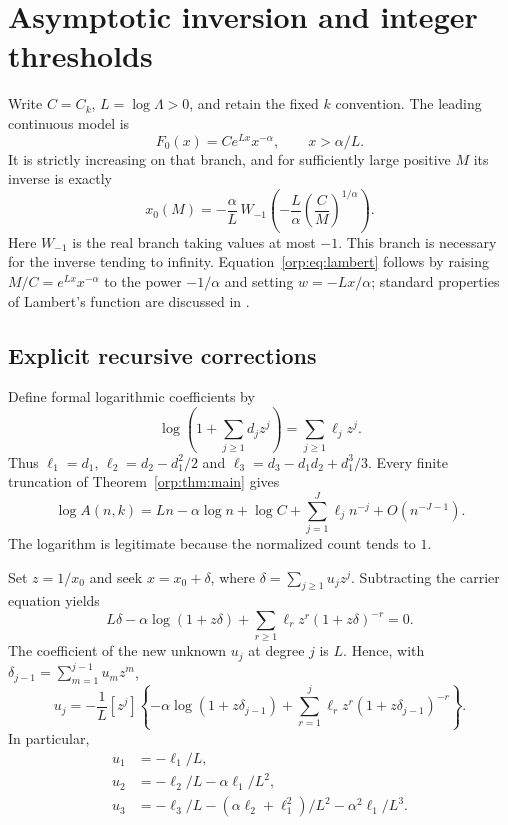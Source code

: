 \documentclass[11pt]{article}
\theoremstyle{remark}\newtheorem{remark}[theorem]{Remark}
\begin{document}
\section{Asymptotic inversion and integer thresholds}\label{orp:sec:inverse}
Write $C=C_k$, $L=\log\Lambda>0$, and retain the fixed $k$ convention. The leading continuous model is
\[
 F_0(x)=Ce^{Lx}x^{-\alpha},\qquad x>\alpha/L.
\]
It is strictly increasing on that branch, and for sufficiently large positive $M$ its inverse is exactly
\begin{equation}\label{orp:eq:lambert}
 x_0(M)=-\frac\alpha L\,W_{-1}\left(-\frac L\alpha
                    \left(\frac CM\right)^{1/\alpha}\right).
\end{equation}
Here $W_{-1}$ is the real branch taking values at most $-1$. This branch is necessary for the inverse tending to infinity. Equation~\eqref{orp:eq:lambert} follows by raising $M/C=e^{Lx}x^{-\alpha}$ to the power $-1/\alpha$ and setting $w=-Lx/\alpha$; standard properties of Lambert's function are discussed in \cite{lambert}.

\subsection{Explicit recursive corrections}
Define formal logarithmic coefficients by
\begin{equation}\label{orp:eq:ell}
 \log\left(1+\sum_{j\ge1}d_jz^j\right)=\sum_{j\ge1}\ell_jz^j.
\end{equation}
Thus $\ell_1=d_1$, $\ell_2=d_2-d_1^2/2$ and
$\ell_3=d_3-d_1d_2+d_1^3/3$. Every finite truncation of Theorem~\ref{orp:thm:main} gives
\begin{equation}\label{orp:eq:logcount}
 \log A(n,k)=Ln-\alpha\log n+\log C+
 \sum_{j=1}^{J}\ell_jn^{-j}+O(n^{-J-1}).
\end{equation}
The logarithm is legitimate because the normalized count tends to $1$.

Set $z=1/x_0$ and seek $x=x_0+\delta$, where $\delta=\sum_{j\ge1}u_jz^j$. Subtracting the carrier equation yields
\begin{equation}\label{orp:eq:invformal}
 L\delta-\alpha\log(1+z\delta)+
 \sum_{r\ge1}\ell_rz^r(1+z\delta)^{-r}=0.
\end{equation}
The coefficient of the new unknown $u_j$ at degree $j$ is $L$. Hence, with
$\delta_{j-1}=\sum_{m=1}^{j-1}u_mz^m$,
\begin{equation}\label{orp:eq:invrec}
 u_j=-\frac1L[z^j]\left\{-\alpha\log(1+z\delta_{j-1})+
          \sum_{r=1}^j\ell_rz^r(1+z\delta_{j-1})^{-r}\right\}.
\end{equation}
In particular,
\begin{align}
 u_1&=-\ell_1/L,\nonumber\\
 u_2&=-\ell_2/L-\alpha\ell_1/L^2,\nonumber\\
 u_3&=-\ell_3/L-(\alpha\ell_2+\ell_1^2)/L^2-\alpha^2\ell_1/L^3.\label{orp:eq:firstu}
\end{align}
\end{document}
